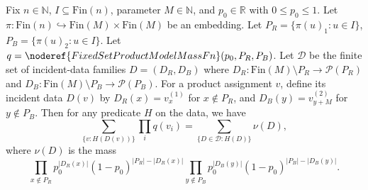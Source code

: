 \begin{helper}
Fix $n\in\mathbb N$, $I\subseteq\mathrm{Fin}(n)$, parameter $M\in\mathbb N$, and $p_0\in\mathbb R$ with $0\le p_0\le1$.
Let $\pi:\mathrm{Fin}(n)\hookrightarrow\mathrm{Fin}(M)\times\mathrm{Fin}(M)$ be an embedding.
Let $P_R=\{\pi(u)_1:u\in I\}$, $P_B=\{\pi(u)_2:u\in I\}$.
Let $q=\noderef{FixedSetProductModelMassFn}(p_0,P_R,P_B)$.
Let $\mathcal D$ be the finite set of incident-data families $D=(D_R, D_B)$ where $D_R:\mathrm{Fin}(M)\setminus P_R\to\mathcal{P}(P_R)$ and $D_B:\mathrm{Fin}(M)\setminus P_B\to\mathcal{P}(P_B)$.
For a product assignment $v$, define its incident data $D(v)$ by $D_R(x)=v_x^{(1)}$ for $x\notin P_R$, and $D_B(y)=v_{y+M}^{(2)}$ for $y\notin P_B$.
Then for any predicate $H$ on the data, we have
\[
\sum_{\{v:H(D(v))\}}\prod_iq(v_i) = \sum_{\{D\in\mathcal D: H(D)\}} \nu(D),
\]
where $\nu(D)$ is the mass
\[
\prod_{x\notin P_R} p_0^{|D_R(x)|}(1-p_0)^{|P_R|-|D_R(x)|} \prod_{y\notin P_B} p_0^{|D_B(y)|}(1-p_0)^{|P_B|-|D_B(y)|}.
\]
\end{helper}
